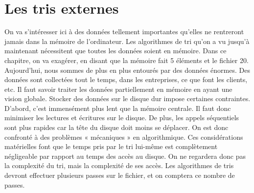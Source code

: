 \documentclass[10pt]{article}
\begin{document}
\section{Les tris externes}
On va s'intéresser ici à des données tellement importantes qu'elles ne rentreront jamais dans la mémoire de l'ordinateur. Les algorithmes de tri qu'on a vu jusqu'à maintenant nécessitent que toutes les données soient en mémoire. Dans ce chapitre, on va exagérer, en disant que la mémoire fait 5 éléments et le fichier 20.  
\newline \newline 
Aujourd'hui, nous sommes de plus en plus entourés par des données énormes. Des données sont collectées tout le temps, dans les entreprises, ce que font les clients, etc. Il faut savoir traiter les données partiellement en mémoire en ayant une vision globale. 
\newline \newline 
Stocker des données sur le disque dur impose certaines contraintes. D'abord, c'est immensément plus lent que la mémoire centrale. Il faut donc minimiser les lectures et écritures sur le disque. De plus, les appels séquentiels sont plus rapides car la tête du disque doit moins se déplacer. On est donc confronté à des problèmes « mécaniques » en algorithmique. 
\newline \newline 
Ces considérations matérielles font que le temps pris par le tri lui-même est complètement négligeable par rapport au temps des accès au disque. On ne regardera donc pas la complexité du tri, mais la complexité de ses accès. Les algorithmes de tris devront effectuer plusieurs passes sur le fichier, et on comptera ce nombre de passes.
\end{document}
